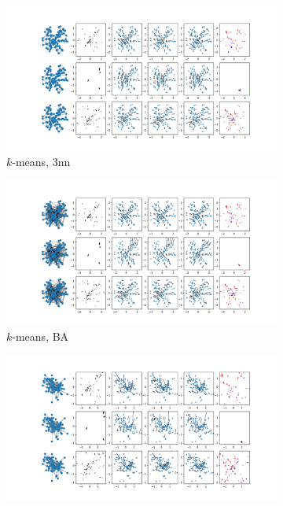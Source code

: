 \documentclass[a4paper,10pt]{article}
\begin{document}
\begin{figure}[htbp]
\begin{subfigure}{0.24\textwidth}
    \centering
    \includegraphics[trim={0 13.2cm 29.35cm 0},clip,width=\textwidth]{../results/nn-100N-noemb-fixed}
    \caption{$k$-means, 3nn}
  \end{subfigure}
  \begin{subfigure}{0.24\textwidth}
    \centering
    \includegraphics[trim={0 13.2cm 29cm 0},clip,width=\textwidth]{../results/ba-100N-noemb-fixed}
    \caption{$k$-means, BA}
  \end{subfigure}
  \begin{subfigure}{0.24\textwidth}
    \centering
    \includegraphics[trim={0 13.2cm 29cm 0},clip,width=\textwidth]{../results/rn1-100N-noemb0}

\end{subfigure}
\end{figure}
\end{document}

